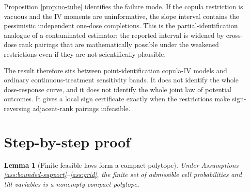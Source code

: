 \documentclass[11pt]{article}
\theoremstyle{definition}
\theoremstyle{plain}
\newtheorem{lemma}{Lemma}
\theoremstyle{remark}
\begin{document}
Proposition \ref{prop:no-tube} identifies the failure mode.  If the copula restriction is vacuous and the IV moments are uninformative, the slope interval contains the pessimistic independent one-dose completions.  This is the partial-identification analogue of a contaminated estimator: the reported interval is widened by cross-dose rank pairings that are mathematically possible under the weakened restrictions even if they are not scientifically plausible.

The result therefore sits between point-identification copula-IV models and ordinary continuous-treatment sensitivity bands.  It does not identify the whole dose-response curve, and it does not identify the whole joint law of potential outcomes.  It gives a local sign certificate exactly when the restrictions make sign-reversing adjacent-rank pairings infeasible.

\section{Step-by-step proof}
\begin{lemma}[Finite feasible laws form a compact polytope]\label{lem:polytope}
Under Assumptions \ref{ass:bounded-support}--\ref{ass:grid}, the finite set of admissible cell probabilities and tilt variables is a nonempty compact polytope.
\end{lemma}
\end{document}
